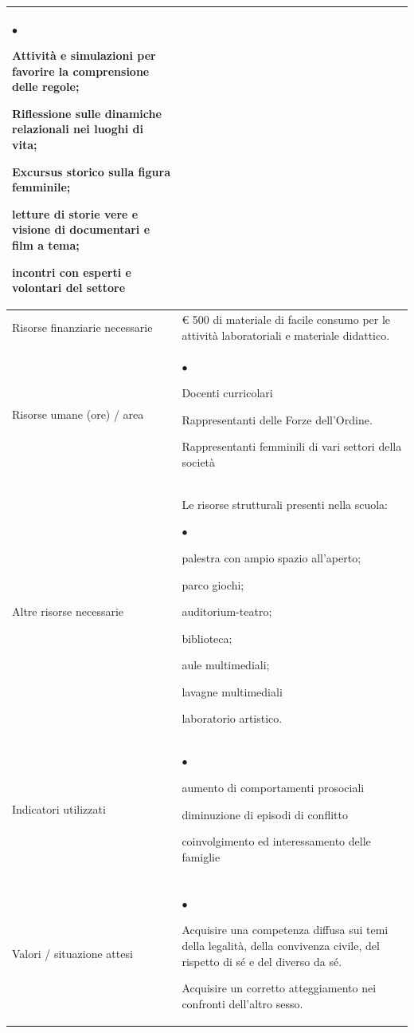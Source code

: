 \documentclass[12pt,a4paper,oneside]{memoir}
\newenvironment{elenco}{\begin{list}{$\bullet$}{%
              \setlength{\leftmargin}{4mm}%
              \setlength{\rightmargin}{1mm}%
               \setlength{\itemindent}{0mm}%
               \setlength{\labelwidth}{2mm}%
               \setlength{\labelsep}{2mm}%
              \setlength{\itemsep}{-\parsep}%
              \setlength{\partopsep}{0pt}%
              \setlength{\topsep}{0pt}%
             \setlength{\parskip}{0pt}%
              }}{\end{list}}
\begin{document}
\begin{footnotesize}
\begin{longtable}{|>{\raggedright}p{2.5cm}|>{\raggedright\arraybackslash}P{10cm}|}
\begin{elenco}
\item Attività e simulazioni per favorire la comprensione delle regole; 
\item Riflessione sulle dinamiche relazionali nei luoghi di vita;
\item Excursus storico sulla figura femminile; 
\item letture di storie vere e visione di documentari e film a tema; 
\item incontri con esperti e volontari del settore
\end{elenco}\\[-4mm] \hline
Risorse finanziarie necessarie&€ 500 di materiale di facile consumo per le attività laboratoriali e materiale didattico.\\ \hline
Risorse umane (ore) / area&
\begin{elenco}
\item Docenti curricolari 
\item Rappresentanti delle Forze dell'Ordine.
\item Rappresentanti femminili di vari settori della società
\end{elenco}\\ \hline
Altre risorse necessarie&Le risorse strutturali presenti nella scuola:
\begin{elenco}
\item palestra con ampio spazio all'aperto;
\item parco giochi;
\item auditorium-teatro;
\item biblioteca;
\item aule multimediali;
\item lavagne multimediali
\item  laboratorio artistico.
\end{elenco}\\[-4mm] \hline
Indicatori utilizzati&
\begin{elenco}
\item aumento di comportamenti prosociali
\item diminuzione di episodi di conflitto
\item coinvolgimento ed interessamento delle famiglie
\end{elenco}\\[-4mm] \hline
&\\ \hline
Valori / situazione attesi&
\begin{elenco}
\item Acquisire una competenza diffusa sui temi della legalità, della convivenza civile, del rispetto di sé e del diverso da sé.
\item Acquisire un corretto atteggiamento nei confronti dell'altro sesso.
\end{elenco}\\ \hline
\end{longtable}
\end{footnotesize}
\end{document}

